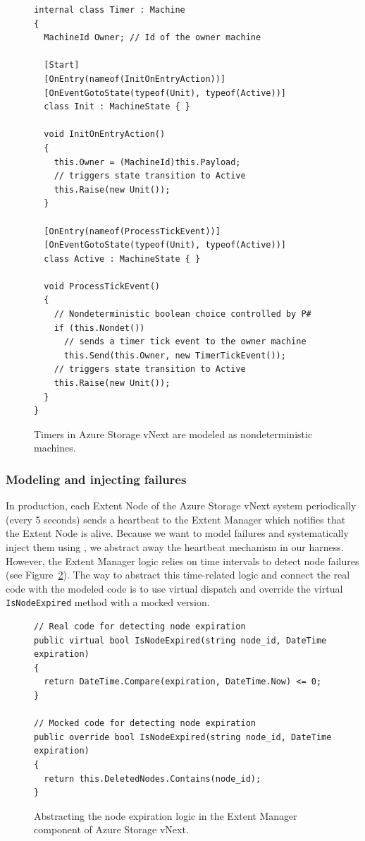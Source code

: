 \begin{figure}[t]
\begin{lstlisting}
internal class Timer : Machine
{
  MachineId Owner; // Id of the owner machine

  [Start]
  [OnEntry(nameof(InitOnEntryAction))]
  [OnEventGotoState(typeof(Unit), typeof(Active))]
  class Init : MachineState { }

  void InitOnEntryAction()
  {
    this.Owner = (MachineId)this.Payload;
    // triggers state transition to Active
    this.Raise(new Unit());
  }

  [OnEntry(nameof(ProcessTickEvent))]
  [OnEventGotoState(typeof(Unit), typeof(Active))]
  class Active : MachineState { }

  void ProcessTickEvent()
  {
    // Nondeterministic boolean choice controlled by P#
    if (this.Nondet())
      // sends a timer tick event to the owner machine
      this.Send(this.Owner, new TimerTickEvent());
    // triggers state transition to Active
    this.Raise(new Unit());
  }
}
\end{lstlisting}
\vspace{-2mm}
\caption{Timers in Azure Storage vNext are modeled as nondeterministic \psharp machines.}
\label{fig:timer}
\end{figure}

\subsubsection{Modeling and injecting failures}
\label{sec:method:model:failures}

In production, each Extent Node of the Azure Storage vNext system periodically (every 5 seconds) sends a heartbeat to the Extent Manager which notifies that the Extent Node is alive. Because we want to model failures and systematically inject them using \psharp, we abstract away the heartbeat mechanism in our harness. However, the Extent Manager logic relies on time intervals to detect node failures (see Figure~\ref{fig:expiration}). The way to abstract this time-related logic and connect the real code with the modeled code is to use virtual dispatch and override the virtual \texttt{IsNodeExpired} method with a mocked version.

\begin{figure}[t]
\begin{lstlisting}
// Real code for detecting node expiration
public virtual bool IsNodeExpired(string node_id, DateTime expiration)
{
  return DateTime.Compare(expiration, DateTime.Now) <= 0;
}

// Mocked code for detecting node expiration
public override bool IsNodeExpired(string node_id, DateTime expiration)
{
  return this.DeletedNodes.Contains(node_id);
}
\end{lstlisting}
\vspace{-2mm}
\caption{Abstracting the node expiration logic in the Extent Manager component of Azure Storage vNext.}
\label{fig:expiration}
\end{figure}

